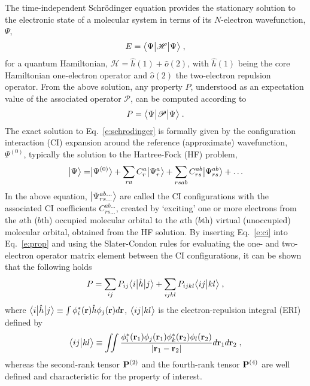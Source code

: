 The time\hyp{}independent Schr{\"o}dinger equation provides the stationary solution to the
electronic state
of a molecular system in terms of its $N$\hyp{}electron wavefunction, $\Psi$,
%
\begin{equation} \label{e:schrodinger}
 E = \tBraKet{\Psi}{\mathscr{H}}{\Psi} \;,
\end{equation}
%
for a quantum Hamiltonian, $\mathscr{H} = \hat{h}(1) + \hat{o}(2)$,
with $\hat{h}(1)$ being the core Hamiltonian one\hyp{}electron operator
and $\hat{o}(2)$ the two\hyp{}electron repulsion operator.
From the above solution, any property $P$, understood as an expectation value of the
associated operator $\mathscr{P}$, can be computed according to
%
\begin{equation} \label{e:prop}
 P = \tBraKet{\Psi}{\mathscr{P}}{\Psi} \;.
\end{equation}
%
The exact solution to Eq.~\eqref{e:schrodinger} is formally given by
the configuration interaction (CI) expansion around the reference 
(approximate) wavefunction, $\Psi^{(0)}$,
typically the solution to the Hartree\hyp{}Fock (HF) problem,
%
\begin{equation} \label{e:ci}
 \Ket{\Psi} = \Ket{\Psi^{(0)}} + \sum_{ra} C_{r}^{a} \Ket{\Psi_{r}^{a}} + 
	 \sum_{rsab} C_{rs}^{ab} \Ket{\Psi_{rs}^{ab}} + \ldots
\end{equation}
%
In the above equation,
$\Ket{\Psi_{rs\ldots}^{ab\ldots}}$ are called the CI configurations
with the associated CI coefficients $C_{rs\ldots}^{ab\ldots}$, created by `exciting'
one or more electrons from the $a$th ($b$th) occupied molecular orbital to the $a$th ($b$th)
virtual (unoccupied) molecular orbital, obtained from the HF solution.
By inserting Eq.~\eqref{e:ci} into Eq.~\eqref{e:prop} 
and using the Slater\hyp{}Condon rules for evaluating the one\hyp{} and two\hyp{}electron
operator matrix element between
the CI configurations, it can be shown that the following holds
%
\begin{equation} \label{e:exp-val-series}
	P =
	\sum_{ij} P_{ij} \tBraKet{i}{\hat{h}}{j}
	+ \sum_{ijkl} P_{ijkl} \BraKet{ij}{kl}  \;,
\end{equation}
%
where $\tBraKet{i}{\hat{h}}{j} \equiv \int \phi^*_i({\bf r}) \hat{h} \phi_j({\bf r}) d{\bf r} $,
$\BraKet{ij}{kl}$ is the electron\hyp{}repulsion integral (ERI) defined by
%
\begin{equation}
	\BraKet{ij}{kl} \equiv
	\iint 
	\frac{ \phi_i^{*}({\bf r}_1) \phi_j({\bf r}_1) 
	       \phi_k^{*}({\bf r}_2) \phi_l({\bf r}_2) }{ \vert {\bf r}_1 - {\bf r}_2 \vert}
	d{\bf r}_1 d{\bf r}_2  \;,
\end{equation}
%
whereas the second\hyp{}rank tensor ${\bf P}^{(2)}$ 
and the fourth\hyp{}rank tensor ${\bf P}^{(4)}$ 
are well defined and characteristic for the property of interest.

